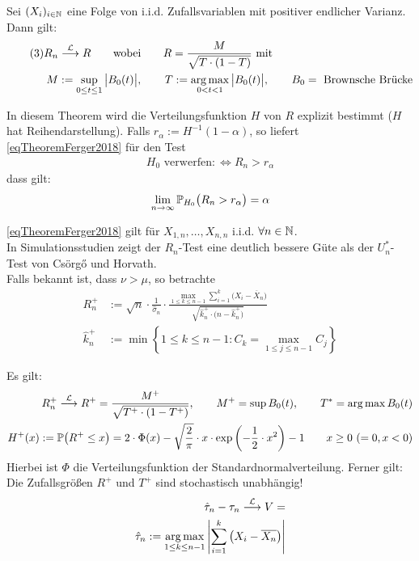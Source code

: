 \begin{thm}%
	Sei $(X_i)_{i\in\mathbb{N}}$ eine Folge von i.i.d. Zufallsvariablen mit positiver endlicher Varianz. Dann gilt:
	\begin{align}\label{eqTheoremFerger2018}\tag{3}
		R_n&\stackrel{\mathcal{L}}{\longrightarrow} R
		\qquad\text{wobei}\qquad
		R=\frac{M}{\sqrt{T\cdot(1-T)}}\text{ mit }\\
		M&:=\sup\limits_{0\leq t\leq 1}\big|B_0(t)\big|\nonumber,\qquad
		T:=\operatorname*{arg\,max}\limits_{0<t<1}\big|B_0(t)\big|,\qquad
		B_0=\text{ Brownsche Brücke}\nonumber
	\end{align}
\end{thm}

In diesem Theorem %
wird die Verteilungsfunktion $H$ von $R$ explizit bestimmt ($H$ hat Reihendarstellung).
Falls $r_\alpha:=H^{-1}(1-\alpha)$, so liefert \eqref{eqTheoremFerger2018} für den Test
\begin{align*}
	H_0\text{ verwerfen}:\Longleftrightarrow R_n>r_\alpha
\end{align*}
dass gilt:
\begin{align*}
	\lim\limits_{n\to\infty}\mathbb{P}_{H_0}\big(R_n>r_\alpha\big)=\alpha
\end{align*}

\begin{bemerkung}
	\eqref{eqTheoremFerger2018} gilt für $X_{1,n},\ldots,X_{n,n}$ i.i.d. $\forall n\in\mathbb{N}$.\\
	In Simulationsstudien zeigt der $R_n$-Test eine deutlich bessere Güte als der $U_n^\ast$-Test von Csörgő und Horvath.\\
	Falls bekannt ist, dass $\nu>\mu$, so betrachte
	\begin{align*}
		R_n^+&:=\sqrt{n}\cdot\frac{1}{\hat{\sigma}_n}\cdot\frac{\max\limits_{1\leq k\leq n-1}\sum\limits_{i=1}^k\big(X_i-\overline{X}_n\big)}{\sqrt{\hat{k}_n^+\cdot\big(n-\hat{k}_n^+\big)}}\\
		\hat{k}_n^+&:=\min\left\lbrace 1\leq k\leq n-1:C_k=\max\limits_{1\leq j\leq n-1}C_j\right\rbrace
	\end{align*}
\end{bemerkung}

Es gilt:
\begin{align*}
	R_n^+\stackrel{\mathcal{L}}{\longrightarrow} R^+=\frac{M^+}{\sqrt{T^+\cdot(1-T^+)}},\qquad
	M^+=\sup\limits B_0(t),\qquad
	T^*=\operatorname*{arg\,max}\limits B_0(t)\\
	H^+(x):=\mathbb{P}\big(R^+\leq x\big)=2\cdot\Phi(x)-\sqrt{\frac{2}{\pi}}\cdot x\cdot\exp\left(-\frac{1}{2}\cdot x^2\right)-1\qquad x\geq0~(=0, x<0)
\end{align*}
Hierbei ist $\Phi$ die Verteilungsfunktion der Standardnormalverteilung. Ferner gilt:\\
Die Zufallsgrößen $R^+$ und $T^+$ sind stochastisch unabhängig!
\begin{align*}
	\hat{\tau}_n-\tau_n\stackrel{\mathcal{L}}{\longrightarrow}V=\\
	\hat{\tau}_n:=\operatorname*{arg\,max}\limits_{1\leq k\leq n-1}\left|\sum\limits_{i=1}^k\big(X_i-\overline{X_n}\big)\right|
\end{align*}


